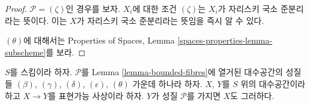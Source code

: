 \begin{proof}
\medskip\noindent
$\mathcal{P} = (\zeta)$인 경우를 보자. $X_i$에 대한 조건
$(\zeta)$는 $X_i$가 자리스키 국소 준분리라는 뜻이다.
이는 $X$가 자리스키 국소 준분리라는 뜻임을 즉시 알 수 있다.

\medskip\noindent
$(\theta)$에 대해서는 Properties of Spaces, Lemma
\ref{spaces-properties-lemma-subscheme}를 보라.
\end{proof}

\begin{lemma}
\label{lemma-representable-properties}
$S$를 스킴이라 하자. $\mathcal{P}$를 Lemma
\ref{lemma-bounded-fibres}에 열거된 대수공간의 성질들
$(\beta)$, $(\gamma)$, $(\delta)$, $(\epsilon)$, $(\theta)$ 가운데
하나라 하자. $X$, $Y$를 $S$ 위의 대수공간이라 하고
$X \to Y$를 표현가능 사상이라 하자.
$Y$가 성질 $\mathcal{P}$를 가지면 $X$도 그러하다.
\end{lemma}

